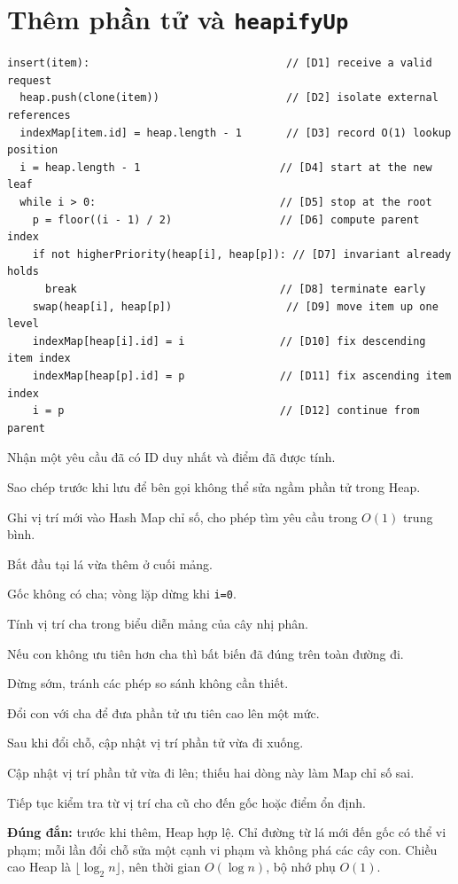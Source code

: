 \documentclass[12pt,a4paper,twoside,openright]{report}
\newcommand{\code}[1]{\texttt{#1}}
\begin{document}
\section{Thêm phần tử và \code{heapifyUp}}
\begin{lstlisting}[style=algorithm]
insert(item):                               // [D1] receive a valid request
  heap.push(clone(item))                    // [D2] isolate external references
  indexMap[item.id] = heap.length - 1       // [D3] record O(1) lookup position
  i = heap.length - 1                      // [D4] start at the new leaf
  while i > 0:                             // [D5] stop at the root
    p = floor((i - 1) / 2)                 // [D6] compute parent index
    if not higherPriority(heap[i], heap[p]): // [D7] invariant already holds
      break                                // [D8] terminate early
    swap(heap[i], heap[p])                  // [D9] move item up one level
    indexMap[heap[i].id] = i               // [D10] fix descending item index
    indexMap[heap[p].id] = p               // [D11] fix ascending item index
    i = p                                  // [D12] continue from parent
\end{lstlisting}
\begin{description}[leftmargin=1.2cm,labelwidth=0.8cm,style=multiline,
  font=\ttfamily\bfseries,itemsep=2pt]
  \item[D1] Nhận một yêu cầu đã có ID duy nhất và điểm đã được tính.
  \item[D2] Sao chép trước khi lưu để bên gọi không thể sửa ngầm phần tử trong Heap.
  \item[D3] Ghi vị trí mới vào Hash Map chỉ số, cho phép tìm yêu cầu trong $O(1)$ trung bình.
  \item[D4] Bắt đầu tại lá vừa thêm ở cuối mảng.
  \item[D5] Gốc không có cha; vòng lặp dừng khi \code{i=0}.
  \item[D6] Tính vị trí cha trong biểu diễn mảng của cây nhị phân.
  \item[D7] Nếu con không ưu tiên hơn cha thì bất biến đã đúng trên toàn đường đi.
  \item[D8] Dừng sớm, tránh các phép so sánh không cần thiết.
  \item[D9] Đổi con với cha để đưa phần tử ưu tiên cao lên một mức.
  \item[D10] Sau khi đổi chỗ, cập nhật vị trí phần tử vừa đi xuống.
  \item[D11] Cập nhật vị trí phần tử vừa đi lên; thiếu hai dòng này làm Map chỉ số sai.
  \item[D12] Tiếp tục kiểm tra từ vị trí cha cũ cho đến gốc hoặc điểm ổn định.
\end{description}
\textbf{Đúng đắn:} trước khi thêm, Heap hợp lệ. Chỉ đường từ lá mới đến gốc có thể vi phạm;
mỗi lần đổi chỗ sửa một cạnh vi phạm và không phá các cây con. Chiều cao Heap là
$\lfloor\log_2 n\rfloor$, nên thời gian $O(\log n)$, bộ nhớ phụ $O(1)$.
\end{document}
